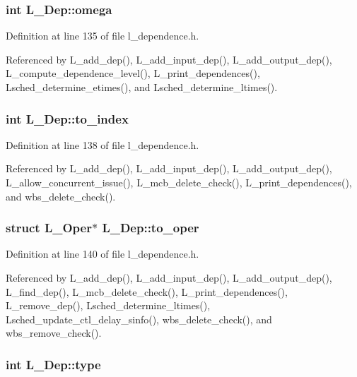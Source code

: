 \subsubsection{\setlength{\rightskip}{0pt plus 5cm}int \bf{L\_\-Dep::omega}}\label{structL__Dep_c941545f366152dd8ee99d14b873f3eb}




Definition at line 135 of file l\_\-dependence.h.

Referenced by L\_\-add\_\-dep(), L\_\-add\_\-input\_\-dep(), L\_\-add\_\-output\_\-dep(), L\_\-compute\_\-dependence\_\-level(), L\_\-print\_\-dependences(), Lsched\_\-determine\_\-etimes(), and Lsched\_\-determine\_\-ltimes().
\subsubsection{\setlength{\rightskip}{0pt plus 5cm}int \bf{L\_\-Dep::to\_\-index}}\label{structL__Dep_2c2923be7c8b34d5d567fe0fd606ac56}




Definition at line 138 of file l\_\-dependence.h.

Referenced by L\_\-add\_\-dep(), L\_\-add\_\-input\_\-dep(), L\_\-add\_\-output\_\-dep(), L\_\-allow\_\-concurrent\_\-issue(), L\_\-mcb\_\-delete\_\-check(), L\_\-print\_\-dependences(), and wbs\_\-delete\_\-check().
\subsubsection{\setlength{\rightskip}{0pt plus 5cm}struct L\_\-Oper$\ast$ \bf{L\_\-Dep::to\_\-oper}}\label{structL__Dep_0908456ef0f4f4c04f161092e5bc9243}




Definition at line 140 of file l\_\-dependence.h.

Referenced by L\_\-add\_\-dep(), L\_\-add\_\-input\_\-dep(), L\_\-add\_\-output\_\-dep(), L\_\-find\_\-dep(), L\_\-mcb\_\-delete\_\-check(), L\_\-print\_\-dependences(), L\_\-remove\_\-dep(), Lsched\_\-determine\_\-ltimes(), Lsched\_\-update\_\-ctl\_\-delay\_\-sinfo(), wbs\_\-delete\_\-check(), and wbs\_\-remove\_\-check().
\subsubsection{\setlength{\rightskip}{0pt plus 5cm}int \bf{L\_\-Dep::type}}\label{structL__Dep_a75e270c32101c223f10620bc4ed49d3}




